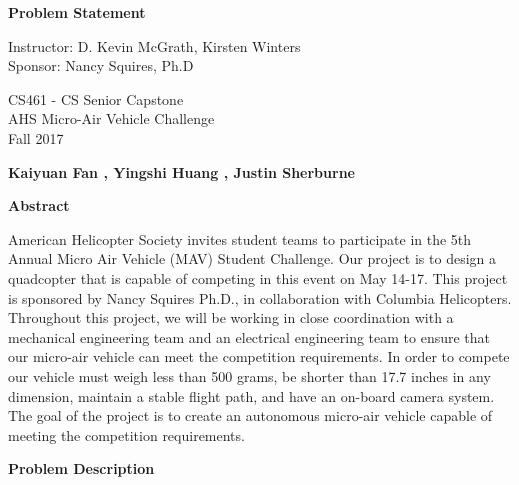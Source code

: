 \documentclass[10pt,letterpaper,onecolumn]{article}
\begin{document}
\begin{titlepage}
\begin{center}
    \huge
    \textbf{Problem Statement}
    
    \vspace{0.4in}
    \large
    Instructor: D. Kevin McGrath, Kirsten Winters\\
    Sponsor: Nancy Squires, Ph.D
    
    \vspace{0.2in}
    \large
    CS461 - CS Senior Capstone\\
    AHS Micro-Air Vehicle Challenge\\
    Fall 2017
    
    \vspace{0.2in}
    \textbf{Kaiyuan Fan , Yingshi Huang , Justin Sherburne }
    
    \vspace{0.5in}
    \textbf{Abstract}\\
    \vspace{0.2in}
    \end{center}
American Helicopter Society invites student teams to participate in the 5th Annual Micro Air Vehicle (MAV) Student Challenge. Our project is to design a quadcopter that is capable of competing in this event on May 14-17. This project is sponsored by Nancy Squires Ph.D., in collaboration with Columbia Helicopters. Throughout this project, we will be working in close coordination with a mechanical engineering team and an electrical engineering team to ensure that our micro-air vehicle can meet the competition requirements. In order to compete our vehicle must weigh less than 500 grams, be shorter than 17.7 inches in any dimension, maintain a stable flight path, and have an on-board camera system. The goal of the project is to create an autonomous micro-air vehicle capable of meeting the competition requirements.
    
    \vspace{0.3in}
\end{titlepage}


\newpage

\begin{center}
\large
\textbf{Problem Description}
\end{center}
\end{document}
